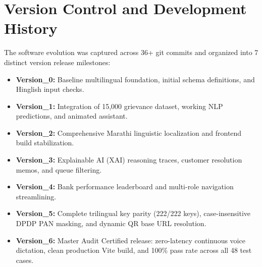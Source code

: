 \section{Version Control and Development History}
The software evolution was captured across 36+ git commits and organized into 7 distinct version release milestones:
\begin{itemize}
    \item \textbf{Version\_0:} Baseline multilingual foundation, initial schema definitions, and Hinglish input checks.
    \item \textbf{Version\_1:} Integration of 15,000 grievance dataset, working NLP predictions, and animated assistant.
    \item \textbf{Version\_2:} Comprehensive Marathi linguistic localization and frontend build stabilization.
    \item \textbf{Version\_3:} Explainable AI (XAI) reasoning traces, customer resolution memos, and queue filtering.
    \item \textbf{Version\_4:} Bank performance leaderboard and multi-role navigation streamlining.
    \item \textbf{Version\_5:} Complete trilingual key parity (222/222 keys), case-insensitive DPDP PAN masking, and dynamic QR base URL resolution.
    \item \textbf{Version\_6:} Master Audit Certified release: zero-latency continuous voice dictation, clean production Vite build, and 100\% pass rate across all 48 test cases.
\end{itemize}

